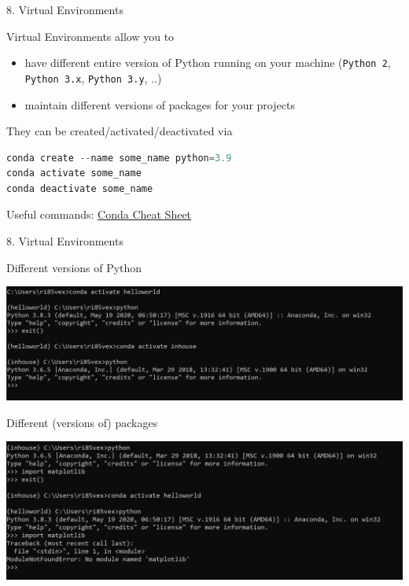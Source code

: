 
\begin{vbframe}{8. Virtual Environments}

\vfill

Virtual Environments allow you to 

\begin{itemize}
	\item have different entire version of Python running on your machine (\texttt{Python 2}, \texttt{Python 3.x}, \texttt{Python 3.y}, ..)
	\item maintain different versions of packages for your projects
\end{itemize}

\vspace{.3cm}

They can be created/activated/deactivated via

\begin{lstlisting}[language=python]
conda create --name some_name python=3.9
conda activate some_name
conda deactivate some_name
\end{lstlisting}

Useful commands: \href{https://docs.conda.io/projects/conda/en/4.6.0/_downloads/52a95608c49671267e40c689e0bc00ca/conda-cheatsheet.pdf}{Conda Cheat Sheet}

\vfill

\end{vbframe}


\begin{vbframe}{8. Virtual Environments}

\vfill

Different versions of Python

\vspace{.2cm}

\includegraphics[width=.8\textwidth]{figure/envs.png}

Different (versions of) packages

\vspace{.2cm}

\includegraphics[width=.8\textwidth]{figure/envs2.png}

\vfill

\end{vbframe}

